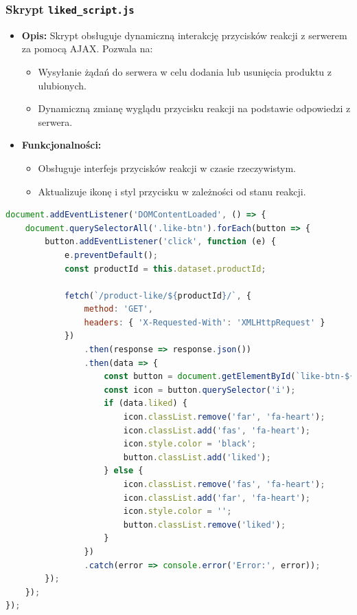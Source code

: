 \documentclass[12pt,a4paper,oneside]{article}
\theoremstyle{definition}
\numberwithin{equation}{section}
\begin{document}
\subsubsection{Skrypt \texttt{liked\_script.js}}
\begin{itemize}
    \item \textbf{Opis:}  
    Skrypt obsługuje dynamiczną interakcję przycisków reakcji z serwerem za pomocą AJAX. Pozwala na:
    \begin{itemize}
        \item Wysyłanie żądań do serwera w celu dodania lub usunięcia produktu z ulubionych.
        \item Dynamiczną zmianę wyglądu przycisku reakcji na podstawie odpowiedzi z serwera.
    \end{itemize}
    \item \textbf{Funkcjonalności:}
    \begin{itemize}
        \item Obsługuje interfejs przycisków reakcji w czasie rzeczywistym.
        \item Aktualizuje ikonę i styl przycisku w zależności od stanu reakcji.
    \end{itemize}
\end{itemize}

\begin{lstlisting}[language=JavaScript, caption=Skrypt \texttt{liked\_script.js}]
document.addEventListener('DOMContentLoaded', () => {
    document.querySelectorAll('.like-btn').forEach(button => {
        button.addEventListener('click', function (e) {
            e.preventDefault();
            const productId = this.dataset.productId;

            fetch(`/product-like/${productId}/`, {
                method: 'GET',
                headers: { 'X-Requested-With': 'XMLHttpRequest' }
            })
                .then(response => response.json())
                .then(data => {
                    const button = document.getElementById(`like-btn-${productId}`);
                    const icon = button.querySelector('i');
                    if (data.liked) {
                        icon.classList.remove('far', 'fa-heart');
                        icon.classList.add('fas', 'fa-heart');
                        icon.style.color = 'black';
                        button.classList.add('liked');
                    } else {
                        icon.classList.remove('fas', 'fa-heart');
                        icon.classList.add('far', 'fa-heart');
                        icon.style.color = '';
                        button.classList.remove('liked');
                    }
                })
                .catch(error => console.error('Error:', error));
        });
    });
});
\end{lstlisting}
\end{document}
